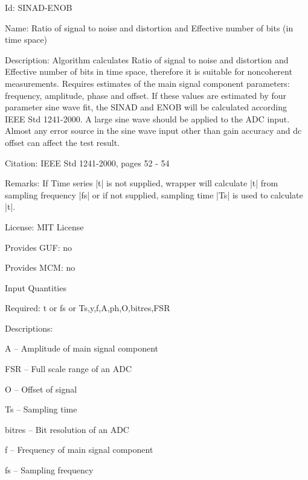 \begin{tightdesc}
\item [Id:] SINAD-ENOB
\item [Name:] Ratio of signal to noise and distortion and Effective number of bits (in time space)
\item [Description:]  Algorithm calculates Ratio of signal to noise and distortion and Effective number of bits in time space, therefore it is suitable for noncoherent measurements. Requires estimates of the main signal component parameters: frequency, amplitude, phase and offset. If these values are estimated by four parameter sine wave fit, the SINAD and ENOB will be calculated according IEEE Std 1241-2000. A large sine wave should be applied to the ADC input. Almost any error source in the sine wave input other than gain accuracy and dc offset can affect the test result.
\item [Citation:] IEEE Std 1241-2000, pages 52 - 54
\item [Remarks:] If Time series |t| is not supplied, wrapper will calculate |t| from sampling frequency |fs| or if not supplied, sampling time |Ts| is used to calculate |t|.
\item [License:] MIT License
\item [Provides GUF:] no
\item [Provides MCM:] no
\item [Input Quantities] \rule{0em}{0em}
    \begin{tightdesc}
    \item [Required:] 
        \textsf{t} or \textsf{fs} or \textsf{Ts},\enspace \textsf{y},\enspace \textsf{f},\enspace \textsf{A},\enspace \textsf{ph},\enspace \textsf{O},\enspace \textsf{bitres},\enspace \textsf{FSR}
    \item [Descriptions:] \rule{0em}{0em}
        \begin{tightdesc}
            \item[\textsf{A}] -- Amplitude of main signal component
            \item[\textsf{FSR}] -- Full scale range of an ADC
            \item[\textsf{O}] -- Offset of signal
            \item[\textsf{Ts}] -- Sampling time
            \item[\textsf{bitres}] -- Bit resolution of an ADC
            \item[\textsf{f}] -- Frequency of main signal component
            \item[\textsf{fs}] -- Sampling frequency

\end{tightdesc}
\end{tightdesc}
\end{tightdesc}
